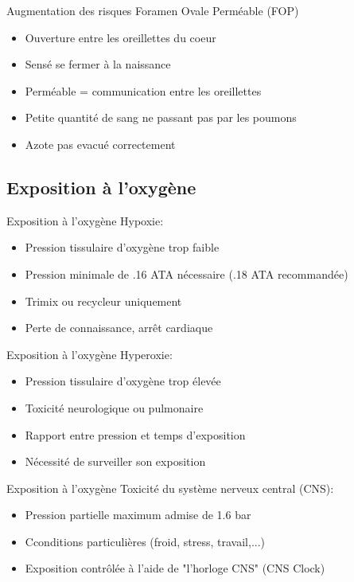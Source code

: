 \begin{frame}{Augmentation des risques}
	Foramen Ovale Perméable (FOP) 
	\begin{itemize}
		\item Ouverture entre les oreillettes du coeur
		\item Sensé se fermer à la naissance
		\item Perméable = communication entre les oreillettes
		\item Petite quantité de sang ne passant pas par les poumons
		\item Azote pas evacué correctement
	\end{itemize}
\end{frame}

\subsection{Exposition à l'oxygène}
	\begin{frame}{Exposition à l'oxygène}  
		Hypoxie:
		\begin{itemize}
			\item Pression tissulaire d'oxygène trop faible
			\item Pression minimale de .16 ATA nécessaire (.18 ATA recommandée)
			\item Trimix ou recycleur uniquement
			\item Perte de connaissance, arrêt cardiaque
		\end{itemize}
	\end{frame}
	
	\begin{frame}{Exposition à l'oxygène} 
		Hyperoxie:
		\begin{itemize}
			\item Pression tissulaire d'oxygène trop élevée
			\item Toxicité neurologique ou pulmonaire
			\item Rapport entre pression et temps d'exposition
			\item Nécessité de surveiller son exposition
		\end{itemize}
	\end{frame}

	\begin{frame}{Exposition à l'oxygène}
		Toxicité du système nerveux central (CNS):
		\begin{itemize}
			\item Pression partielle maximum admise de 1.6 bar
			\item Cconditions particulières (froid, stress, travail,...)
			\item Exposition contrôlée à l'aide de "l'horloge CNS" (CNS Clock)
		\end{itemize}
	\end{frame}

